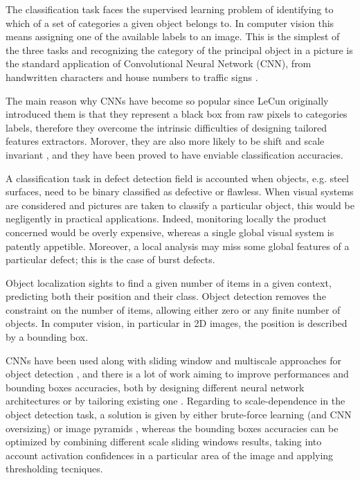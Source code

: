     \par{
        The classification task faces the supervised learning problem of identifying to which of a set of categories a given object belongs to. In computer vision this means assigning one of the available labels to an image. This is the simplest of the three tasks and recognizing the category of the principal object in a picture is the standard application of Convolutional Neural Network (CNN), from handwritten characters \cite{nips:NIPS1989_293, ieee:6248110} and house numbers \cite{ieee:6460867} to traffic signs \cite{ieee:6248110}.

    }
    \par{
        The main reason why CNNs have become so popular since LeCun originally introduced them \cite{nips:NIPS1989_293, ieee:726791, LeCun:1999:ORG:646469.691875, researchgate:deeplearning} is that they represent a black box from raw pixels to categories labels, therefore they overcome the intrinsic difficulties of designing tailored features extractors. Morover, they are also more likely to be shift and scale invariant \cite{LeCun:1999:ORG:646469.691875}, and they have been proved to have enviable classification accuracies.
    }
    \par{
        A classification task in defect detection field is accounted when objects, e.g. steel surfaces, need to be binary classified as defective or flawless. When visual systems are considered and pictures are taken to classify a particular object, this would be negligently in practical applications. Indeed, monitoring locally the product concerned would be overly expensive, whereas a single global visual system is patently appetible. Moreover, a local analysis may miss some global features of a particular defect; this is the case of burst defects.
    }
    \par{
        Object localization sights to find a given number of items in a given context, predicting both their position and their class. Object detection removes the constraint on the number of items, allowing either zero or any finite number of objects. In computer vision, in particular in 2D images, the position is described by a bounding box.
    }
    \par{
        CNNs have been used along with sliding window and multiscale approaches for object detection \cite{ieee:7410526, ieee:7532516, arXiv:1312.6229S}, and there is a lot of work aiming to improve performances and bounding boxes accuracies, both by designing different neural network architectures \cite{ieee:7410526} or by tailoring existing one \cite{ieee:726791}. Regarding to scale-dependence in the object detection task, a solution is given by either brute-force learning (and CNN oversizing) or image pyramids \cite{ieee:7410526}, whereas the bounding boxes accuracies can be optimized by combining different scale sliding windows results, taking into account activation confidences in a particular area of the image and applying thresholding tecniques.
    }

